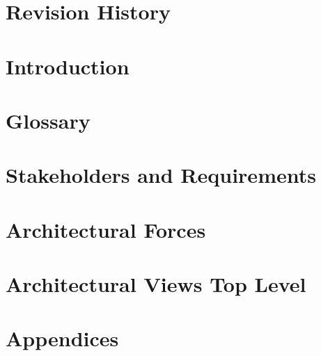 



\newcommand{\hh}[1]{\noindent\textbf{\textit{#1}}}

\newcommand{\ranking}{\textbf{\textit{Ranking: }}}

\nocite{*}

\maketitle

\chapter{Revision History}


\tableofcontents

\let\SavedIndent\indent
\protected\def\indent{%
  \begingroup
    \parindent=\the\parindent
    \SavedIndent
  \endgroup
}
\setlength{\parindent}{0pt}

\chapter{Introduction}





\chapter{Glossary}


\chapter{Stakeholders and Requirements}




\chapter{Architectural Forces}




\chapter{Architectural Views Top Level}






\chapter{Appendices}





